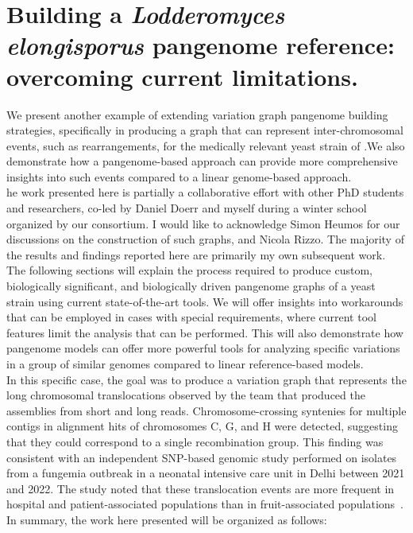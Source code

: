 \section{Building a \emph{Lodderomyces elongisporus} pangenome reference: overcoming current limitations.}
We present another example of extending variation graph pangenome building strategies, specifically in producing a graph that can represent inter-chromosomal events, such as rearrangements, for the medically relevant yeast strain of \lodelo.We also demonstrate how a pangenome-based approach can provide more comprehensive insights into such events compared to a linear genome-based approach.\\
he work presented here is partially a collaborative effort with other PhD students and researchers, co-led by Daniel Doerr and myself during a winter school organized by our consortium. I would like to acknowledge Simon Heumos for our discussions on the construction of such graphs, and Nicola Rizzo. The majority of the results and findings reported here are primarily my own subsequent work.\\
The following sections will explain the process required to produce custom, biologically significant, and biologically driven pangenome graphs of a yeast strain using current state-of-the-art tools. We will offer insights into workarounds that can be employed in cases with special requirements, where current tool features limit the analysis that can be performed. This will also demonstrate how pangenome models can offer more powerful tools for analyzing specific variations in a group of similar genomes compared to linear reference-based models.\\ 
In this specific case, the goal was to produce a variation graph that represents the long chromosomal translocations observed by the team that produced the assemblies from short and long reads. Chromosome-crossing syntenies for multiple contigs in alignment hits of chromosomes C, G, and H were detected, suggesting that they could correspond to a single recombination group. This finding was consistent with an independent SNP-based genomic study performed on isolates from a fungemia outbreak in a neonatal intensive care unit in Delhi between 2021 and 2022. The study noted that these translocation events are more frequent in hospital and patient-associated populations than in fruit-associated populations~\cite{lodelo_india}. \\
In summary, the work here presented will be organized as follows:
